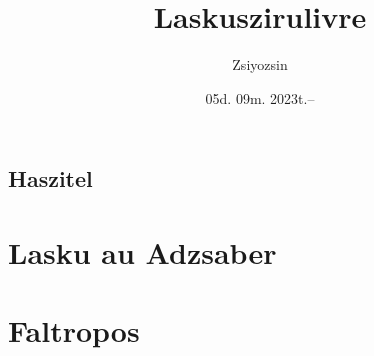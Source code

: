 \documentclass[fontsize=12pt,paper=a4,twoside,numbers=noenddot]{scrbook}
\title{Laskuszirulivre}
\author{Zsiyozsin}
\date{05d. 09m. 2023t.--}
\begin{document}
\maketitle
\tableofcontents

\chapter*{Haszitel}


\part{Lasku au Adzsaber}


\part{Faltropos}
\end{document}
